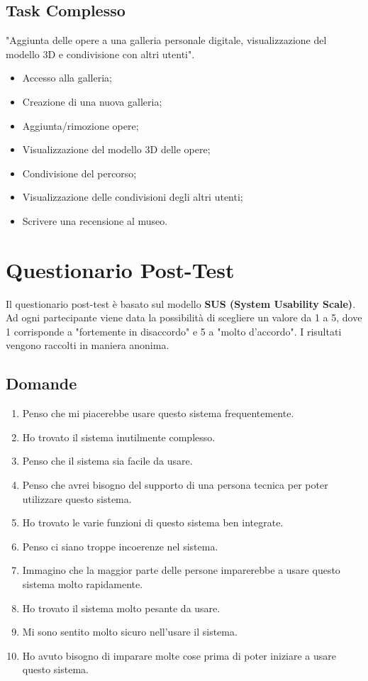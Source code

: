 \documentclass{article}
\begin{document}
\subsection*{Task Complesso}
"Aggiunta delle opere a una galleria personale digitale, visualizzazione del modello 3D e condivisione con altri utenti".
\begin{itemize}
    \item Accesso alla galleria;
    \item Creazione di una nuova galleria;
    \item Aggiunta/rimozione opere;
    \item Visualizzazione del modello 3D delle opere;
    \item Condivisione del percorso;
    \item Visualizzazione delle condivisioni degli altri utenti;
    \item Scrivere una recensione al museo.
\end{itemize}

\section{Questionario Post-Test}
Il questionario post-test \`e basato sul modello \textbf{SUS (System Usability Scale)}. Ad ogni partecipante viene data la possibilit\`a di scegliere un valore da 1 a 5, dove 1 corrisponde a "fortemente in disaccordo" e 5 a "molto d’accordo". I risultati vengono raccolti in maniera anonima.

\subsection*{Domande}
\begin{enumerate}
    \item Penso che mi piacerebbe usare questo sistema frequentemente.
    \item Ho trovato il sistema inutilmente complesso.
    \item Penso che il sistema sia facile da usare.
    \item Penso che avrei bisogno del supporto di una persona tecnica per poter utilizzare questo sistema.
    \item Ho trovato le varie funzioni di questo sistema ben integrate.
    \item Penso ci siano troppe incoerenze nel sistema.
    \item Immagino che la maggior parte delle persone imparerebbe a usare questo sistema molto rapidamente.
    \item Ho trovato il sistema molto pesante da usare.
    \item Mi sono sentito molto sicuro nell'usare il sistema.
    \item Ho avuto bisogno di imparare molte cose prima di poter iniziare a usare questo sistema.
\end{enumerate}
\end{document}
